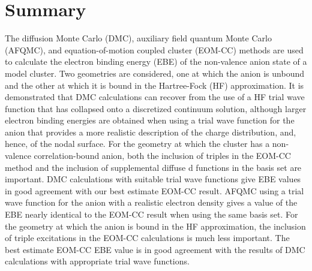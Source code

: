 \section{Summary}
The diffusion Monte Carlo (DMC), auxiliary field quantum Monte Carlo (AFQMC), and equation-of-motion coupled cluster (EOM-CC) methods are used to calculate the electron binding energy (EBE) of the non-valence anion state of a model  cluster.
 Two geometries are considered, one at which the anion is unbound and the other at which it is bound in the Hartree-Fock (HF) approximation.
 It is demonstrated that DMC calculations can recover from the use of a HF trial wave function that has collapsed onto a discretized continuum solution, although larger electron binding energies are obtained when using a trial wave function for the anion that provides a more realistic description of the charge distribution, and, hence, of the nodal surface.
 For the geometry at which the cluster has a non-valence correlation-bound anion, both the inclusion of triples in the EOM-CC method and the inclusion of supplemental diffuse d functions in the basis set are important.
 DMC calculations with suitable trial wave functions give EBE values in good agreement with our best estimate EOM-CC result.
 AFQMC using a trial wave function for the anion with a realistic electron density gives a value of the EBE nearly identical to the EOM-CC result when using the same basis set.
 For the geometry at which the anion is bound in the HF approximation, the inclusion of triple excitations in the EOM-CC calculations is much less important.
 The best estimate EOM-CC EBE value is in good agreement with the results of DMC calculations with appropriate trial wave functions.

